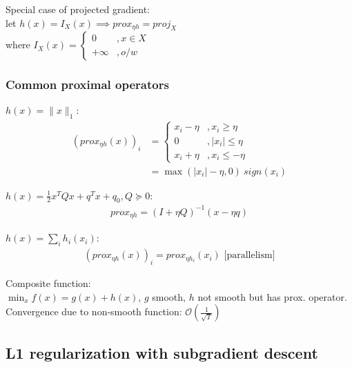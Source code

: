 \documentclass[8pt,letter]{article}
\begin{document}
\begin{multicols*}{2}
  Special case of projected gradient:\\
  let $h(x)=I_X(x) \implies prox_{\eta h} = proj_X$\\
  where $I_X(x) =
  \begin{cases}
    0 &, x \in X\\
    +\infty &, o/w
  \end{cases}$

  \subsubsection{Common proximal operators}
  $h(x) = \|x\|_1$:
  \begin{align*}
    (prox_{\eta h}(x))_i & = \begin{cases}
      x_i - \eta &, x_i \geq \eta\\
      0 &, |x_i| \leq \eta\\
      x_i + \eta &, x_i \leq -\eta
    \end{cases}\\
    & = \max(|x_i|-\eta,0)\ sign(x_i)
  \end{align*}
  
  $h(x)=\frac{1}{2} x^T Q x + q^T x + q_0, Q \succeq 0$:
  \begin{align*}
    prox_{\eta h} = (I + \eta Q)^{-1} (x- \eta q)
  \end{align*}

  $h(x)=\sum_i h_i(x_i)$:
  \begin{align*}
    (prox_{\eta h}(x))_i = prox_{\eta h_i}(x_i) \text{ [parallelism]}
  \end{align*}

  Composite function:\\
  $\min_x f(x) = g(x) + h(x)$, $g$ smooth, $h$ not smooth but has prox. operator. Convergence due to non-smooth function: $\mathcal{O}(\frac{1}{\sqrt{T}})$

  \subsection{L1 regularization with subgradient descent}
  

\end{multicols*}
\end{document}
